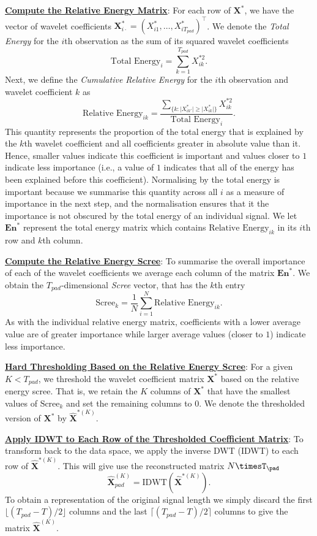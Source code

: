 \begin{steps}
  \item \underline{\textbf{Compute the Relative Energy Matrix}}: For each row of $\mathbf{X}^*$, we have the vector of wavelet coefficients $\mathbf{X}^*_{i\cdot} = (X^*_{i1}, \dots,X^*_{iT_{pad}})^\top$. We denote the \emph{Total Energy} for the $i$th observation as the sum of its squared wavelet coefficients
  $$\text{Total Energy}_i = \sum_{k=1}^{T_{pad}}X^{*2}_{ik}.$$ Next, we define the \emph{Cumulative Relative Energy} for the $i$th observation and wavelet coefficient $k$ as 
  $$
  \text{Relative Energy}_{ik} = \frac{\sum_{\{k: \lvert X^*_{ik'}\rvert  \geq \lvert X^*_{ik}\rvert \}}X^{*2}_{ik}}{\text{Total Energy}_i}.
  $$
  This quantity represents the proportion of the total energy that is explained by the $k$th wavelet coefficient and all coefficients greater in absolute value than it. Hence, smaller values indicate this coefficient is important and values closer to $1$ indicate less importance (i.e., a value of $1$ indicates that all of the energy has been explained before this coefficient).
  Normalising by the total energy is important because we summarise this quantity across all $i$ as a measure of importance in the next step, and the normalisation ensures that it the importance is not obscured by the total energy of an individual signal. We let $\textbf{En}^*$ represent the total energy matrix which contains $\text{Relative Energy}_{ik}$ in its $i$th row and $k$th column.
  \item \underline{\textbf{Compute the Relative Energy Scree}}: To summarise the overall importance of each of the wavelet coefficients we average each column of the matrix $\textbf{En}^*$. We obtain the $T_{pad}$-dimensional \emph{Scree} vector, that has the $k$th entry
  $$
  \text{Scree}_k = \frac{1}{N} \sum_{i=1}^N \text{Relative Energy}_{ik}.
  $$
  As with the individual relative energy matrix, coefficients with a lower average value are of greater importance while larger average values (closer to $1$) indicate less importance.
  \item \underline{\textbf{Hard Thresholding Based on the Relative Energy Scree}}: For a given $K < T_{pad}$, we threshold the wavelet coefficient matrix $\mathbf{X}^*$ based on the relative energy scree. That is, we retain the $K$ columns of $\mathbf{X}^*$ that have the smallest values of $\text{Scree}_k$ and set the remaining columns to $0$. We denote the thresholded version of $\mathbf{X}^*$ by $\widehat{\mathbf{X}}^{*(K)}$.
  \item \underline{\textbf{Apply IDWT to Each Row of the Thresholded Coefficient Matrix}}: To transform back to the data space, we apply the inverse DWT (IDWT) to each row of $\widehat{\mathbf{X}}^{*(K)}$. This will give use the reconstructed matrix $N\timesT_{\pad}$
  $$
  \widehat{\mathbf{X}}^{(K)}_{pad} = \text{IDWT}(\widehat{\mathbf{X}}^{*(K)}).
  $$
  To obtain a representation of the original signal length we simply discard the first $\lfloor (T_{pad} - T)/2 \rfloor$ columns and the last $\lceil (T_{pad} - T)/2 \rceil$ columns to give the matrix $\widehat{\mathbf{X}}^{(K)}$.
\end{steps}
